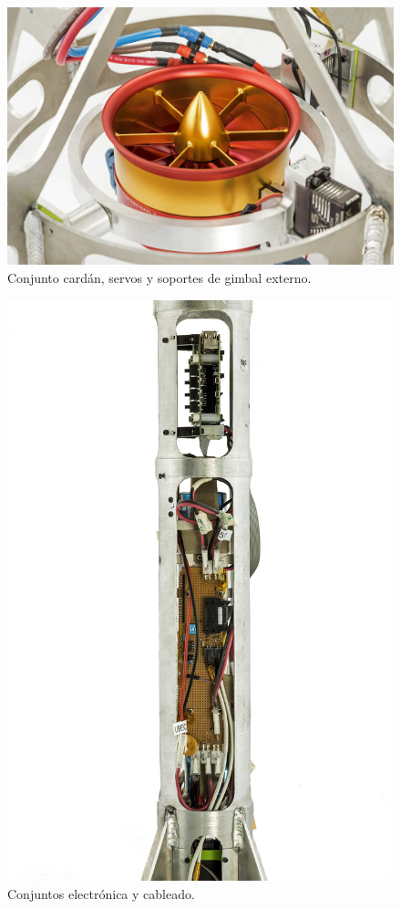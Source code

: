 \begin{figure}[htb]
    \centering
    \includegraphics[height=0.3\pdfpageheight]{fig/hq/gimbal_close.jpg}
    \caption{Conjunto cardán, servos y soportes de gimbal externo.}
    \label{fig:hq/gimbal_close}
\end{figure}

\begin{figure}[htb]
    \centering
    \includegraphics[height=0.3\pdfpageheight]{fig/hq/electronics.jpg}
    \caption{Conjuntos electrónica y cableado.}
    \label{fig:hq/electronics}
\end{figure}

